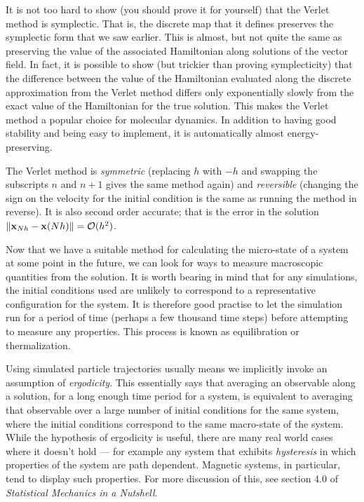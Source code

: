 It is not too hard to show (you should prove it for yourself) that the Verlet method is symplectic. That is, the discrete map that it defines preserves the symplectic form that we saw earlier. This is almost, but not quite the same as preserving the value of the associated Hamiltonian along solutions of the vector field. In fact, it is possible to show (but trickier than proving symplecticity) that the difference between the value of the Hamiltonian evaluated along the discrete approximation from the Verlet method differs only exponentially slowly from the exact value of the Hamiltonian for the true solution. This makes the Verlet method a popular choice for molecular dynamics. In addition to having good stability and being easy to implement, it is automatically almost energy-preserving.

The Verlet method is \emph{symmetric} (replacing $h$ with $-h$ and swapping the subscripts $n$ and $n+1$ gives the same method again) and \emph{reversible} (changing the sign on the velocity for the initial condition is the same as running the method in reverse). It is also second order accurate; that is the error in the solution $\|{\bf x}_{Nh}-{\bf x}(Nh)\|=\mathcal{O}(h^2)$.

Now that we have a suitable method for calculating the micro-state of a system at some point in the future, we can look for ways to measure macroscopic quantities from the solution. It is worth bearing in mind that for any simulations, the initial conditions used are unlikely to correspond to a representative configuration for the system. It is therefore good practise to let the simulation run for a period of time (perhaps a few thousand time steps) before attempting to measure any properties. This process is known as equilibration or thermalization.

Using simulated particle trajectories usually means we implicitly invoke an assumption of \emph{ergodicity}. This essentially says that averaging an observable along a solution, for a long enough time period for a system, is equivalent to averaging that observable over a large number of initial conditions for the same system, where the initial conditions correspond to the same macro-state of the system. While the hypothesis of ergodicity is useful, there are many real world cases where it doesn't hold --- for example any system that exhibits \emph{hysteresis} in which properties of the system are path dependent. Magnetic systems, in particular, tend to display such properties. For more discussion of this, see section 4.0 of \emph{Statistical Mechanics in a Nutshell}.


